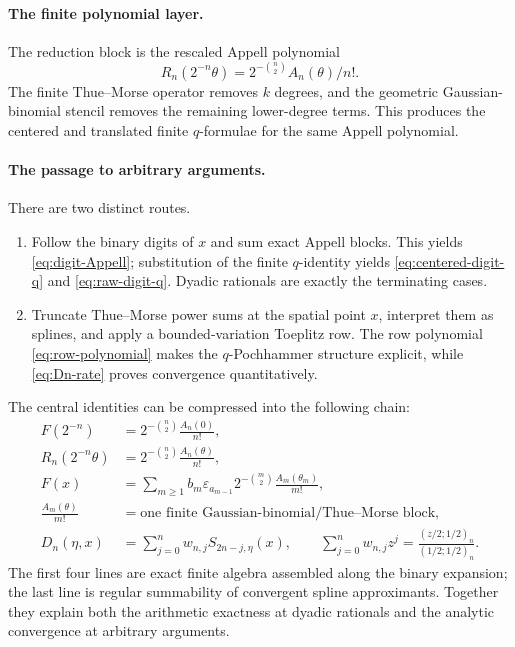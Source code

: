 \documentclass[11pt,oneside]{article}
\theoremstyle{definition}
\theoremstyle{remark}
\newcommand{\eps}{\varepsilon}
\newcommand{\poch}[3]{\left(#1;#2\right)_{#3}}
\begin{document}
\paragraph{The finite polynomial layer.}
The reduction block is the rescaled Appell polynomial
\[
 R_n(2^{-n}\theta)=2^{-\binom n2}A_n(\theta)/n!.
\]
The finite Thue--Morse operator removes $k$ degrees, and the geometric
Gaussian-binomial stencil removes the remaining lower-degree terms.  This
produces the centered and translated finite $q$-formulae for the same Appell
polynomial.

\paragraph{The passage to arbitrary arguments.}
There are two distinct routes.
\begin{enumerate}
\item Follow the binary digits of $x$ and sum exact Appell blocks.  This yields
  \eqref{eq:digit-Appell}; substitution of the finite $q$-identity yields
  \eqref{eq:centered-digit-q} and \eqref{eq:raw-digit-q}.  Dyadic rationals are
  exactly the terminating cases.
\item Truncate Thue--Morse power sums at the spatial point $x$, interpret them
  as splines, and apply a bounded-variation Toeplitz row.  The row polynomial
  \eqref{eq:row-polynomial} makes the $q$-Pochhammer structure explicit, while
  \eqref{eq:Dn-rate} proves convergence quantitatively.
\end{enumerate}

The central identities can be compressed into the following chain:
\begin{equation}\label{eq:final-chain}
\boxed{
\begin{aligned}
 F(2^{-n})
 &=2^{-\binom n2}\frac{A_n(0)}{n!},\\[0.25em]
 R_n(2^{-n}\theta)
 &=2^{-\binom n2}\frac{A_n(\theta)}{n!},\\[0.25em]
 F(x)
 &=\sum_{m\ge1}b_m\eps_{a_{m-1}}
   2^{-\binom m2}\frac{A_m(\theta_m)}{m!},\\[0.25em]
 \frac{A_m(\theta)}{m!}
 &=\text{one finite Gaussian-binomial/Thue--Morse block},\\[0.25em]
 D_n(\eta,x)
 &=\sum_{j=0}^nw_{n,j}S_{2n-j,\eta}(x),
 \qquad
 \sum_{j=0}^nw_{n,j}z^j
 =\frac{\poch{z/2}{1/2}{n}}{\poch{1/2}{1/2}{n}}.
\end{aligned}}
\end{equation}
The first four lines are exact finite algebra assembled along the binary
expansion; the last line is regular summability of convergent spline
approximants.  Together they explain both the arithmetic exactness at dyadic
rationals and the analytic convergence at arbitrary arguments.
\end{document}
